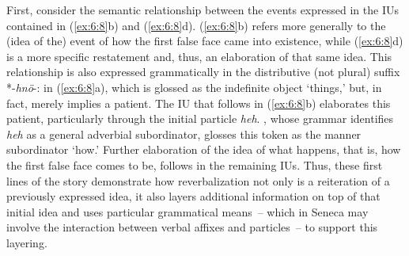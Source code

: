 \noindent First, consider the semantic relationship between the events expressed in the IUs contained in (\ref{ex:6:8}b) and (\ref{ex:6:8}d). (\ref{ex:6:8}b) refers more generally to the (idea of the) event of how the first false face came into existence, while (\ref{ex:6:8}d) is a more specific restatement and, thus, an elaboration of that same idea. This relationship is also expressed grammatically in the distributive (not plural) suffix *-\textit{hnö}-: in (\ref{ex:6:8}a), which is glossed as the indefinite object ‘things,’ but, in fact, merely implies a patient. The IU that follows in (\ref{ex:6:8}b) elaborates this patient, particularly through the initial particle \textit{heh}. \citet[143]{Chafe2014}, whose grammar identifies \textit{heh} as a general adverbial subordinator, glosses this token as the manner subordinator ‘how.’ Further elaboration of the idea of what happens, that is, how the first false face comes to be, follows in the remaining IUs. Thus, these first lines of the story demonstrate how reverbalization not only is a reiteration of a previously expressed idea, it also layers additional information on top of that initial idea and uses particular grammatical means~-- which in Seneca may involve the interaction between verbal affixes and particles~-- to support this layering.

